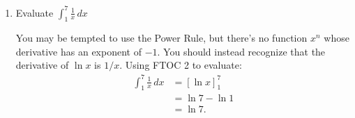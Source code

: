 \documentclass[main]{subfiles}
\begin{document}
\begin{enumerate}[resume]
\begin{enumerate}
    \item
    \begin{problem}[\stretch{0.75}]
    Evaluate $\displaystyle \int_1^7 \frac{1}{x}\,dx$
    \end{problem}

    \begin{solution}
       You may be tempted to use the Power Rule, but there's no function
       $x^n$ whose derivative has an exponent of $-1$. You should
       instead recognize that the derivative of $\ln x$ is $1/x$.
       Using FTOC 2 to evaluate:
        \begin{align*}
            \int_1^7 \frac{1}{x}\,dx &= \left[\ln x\right]_1^7 \\
            &= \ln 7 - \ln 1 \\
            &= \boxed{\ln 7.}
        \end{align*}
    \end{solution}
  \end{enumerate}







\end{enumerate}
\end{document}

